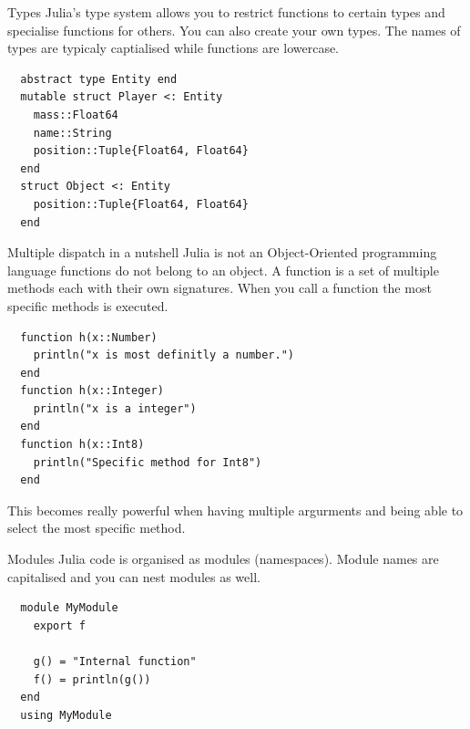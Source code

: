\documentclass{beamer}
\begin{document}
\begin{frame}[fragile]{Types}
  Julia's type system allows you to restrict functions to certain types and specialise functions for others.
  You can also create your own types. The names of types are typicaly captialised while functions are lowercase.
  \begin{Verbatim}
  abstract type Entity end
  mutable struct Player <: Entity 
    mass::Float64
    name::String
    position::Tuple{Float64, Float64}
  end
  struct Object <: Entity
    position::Tuple{Float64, Float64}
  end
  \end{Verbatim}
\end{frame}
\begin{frame}[fragile]{Multiple dispatch in a nutshell}
  Julia is not an Object-Oriented programming language functions do not belong to an object.
  A function is a set of multiple methods each with their own signatures. When you call a function the most specific methods is executed.

  \begin{Verbatim}
  function h(x::Number)
    println("x is most definitly a number.")
  end
  function h(x::Integer)
    println("x is a integer")
  end
  function h(x::Int8)
    println("Specific method for Int8")
  end
  \end{Verbatim}
  This becomes really powerful when having multiple argurments and being able to select the most specific method.
\end{frame}
\begin{frame}[fragile]{Modules}
  Julia code is organised as modules (namespaces). Module names are capitalised and you can nest modules as well.

  \begin{Verbatim}
  module MyModule
    export f

    g() = "Internal function"
    f() = println(g())
  end
  using MyModule
  \end{Verbatim}
\end{frame}
\end{document}
